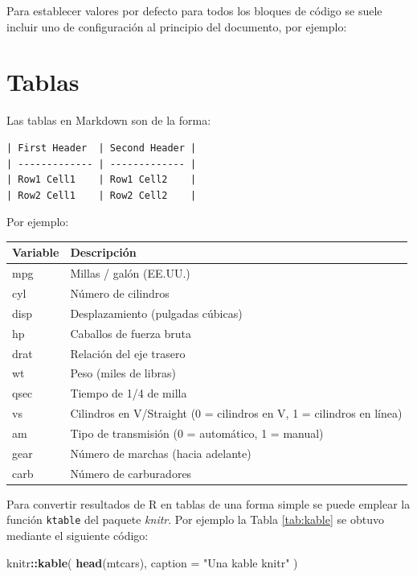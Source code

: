 \documentclass[]{book}
\newenvironment{Shaded}{\begin{snugshade}}{\end{snugshade}}
\newcommand{\KeywordTok}[1]{\textcolor[rgb]{0.13,0.29,0.53}{\textbf{#1}}}
\newcommand{\DataTypeTok}[1]{\textcolor[rgb]{0.13,0.29,0.53}{#1}}
\newcommand{\StringTok}[1]{\textcolor[rgb]{0.31,0.60,0.02}{#1}}
\newcommand{\OperatorTok}[1]{\textcolor[rgb]{0.81,0.36,0.00}{\textbf{#1}}}
\newcommand{\NormalTok}[1]{#1}
\theoremstyle{definition}
\theoremstyle{definition}
\theoremstyle{definition}
\theoremstyle{remark}
\begin{document}
Para establecer valores por defecto para todos los bloques de código se
suele incluir uno de configuración al principio del documento, por
ejemplo:

\begin{Shaded}
\end{Shaded}

\section{Tablas}\label{tablas}

Las tablas en Markdown son de la forma:

\begin{verbatim}
| First Header  | Second Header |
| ------------- | ------------- |
| Row1 Cell1    | Row1 Cell2    |
| Row2 Cell1    | Row2 Cell2    |
\end{verbatim}

Por ejemplo:

\begin{longtable}[]{@{}ll@{}}
\toprule
Variable & Descripción\tabularnewline
\midrule
\endhead
mpg & Millas / galón (EE.UU.)\tabularnewline
cyl & Número de cilindros\tabularnewline
disp & Desplazamiento (pulgadas cúbicas)\tabularnewline
hp & Caballos de fuerza bruta\tabularnewline
drat & Relación del eje trasero\tabularnewline
wt & Peso (miles de libras)\tabularnewline
qsec & Tiempo de 1/4 de milla\tabularnewline
vs & Cilindros en V/Straight (0 = cilindros en V, 1 = cilindros en
línea)\tabularnewline
am & Tipo de transmisión (0 = automático, 1 = manual)\tabularnewline
gear & Número de marchas (hacia adelante)\tabularnewline
carb & Número de carburadores\tabularnewline
\bottomrule
\end{longtable}

Para convertir resultados de R en tablas de una forma simple se puede
emplear la función \texttt{ktable} del paquete \emph{knitr}. Por ejemplo
la Tabla \ref{tab:kable} se obtuvo mediante el siguiente código:

\begin{Shaded}
\begin{Highlighting}[]
\NormalTok{knitr}\OperatorTok{::}\KeywordTok{kable}\NormalTok{(}
  \KeywordTok{head}\NormalTok{(mtcars), }
  \DataTypeTok{caption =} \StringTok{"Una kable knitr"}
\NormalTok{)}
\end{Highlighting}
\end{Shaded}
\end{document}
